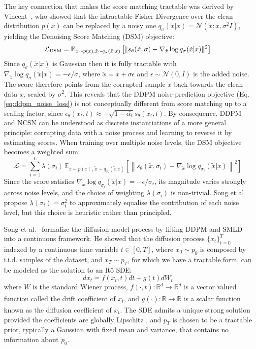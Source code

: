 The key connection that makes the score matching tractable was derived by Vincent\ \cite{vincent2011connection}, who showed that the intractable Fisher Divergence over the clean distribution \(p(x)\) can be replaced by a noisy one \(q_\sigma(\tilde{x}|x)=\mathcal{N}\left(\tilde{x};x,\sigma^2I\right)\), yielding the Denoising Score Matching (DSM) objective:
$$\mathcal{L}_{\text{DSM}}=\mathbb{E}_{x\sim p(x),\space \tilde{x}\sim q_\sigma(\tilde{x}|x)}\left[\|s_\theta(\tilde{x},\sigma)-\nabla_{\tilde{x}} \log q_\sigma(\tilde{x}|x)\|^2 \right]$$Since \(q_\sigma(\tilde{x}|x)\) is Gaussian then it is fully tractable with \(\nabla_{\tilde{x}} \log q_\sigma(\tilde{x}|x)=-\epsilon/\sigma\), where \(\tilde{x}=x+\sigma\epsilon\) and \(\epsilon\sim\mathcal{N}(0,I)\) is the added noise. The score therefore points from the corrupted sample \(\tilde{x}\) back towards the clean data \(x\), scaled by \(\sigma^2\). This reveals that the DDPM noise-prediction objective (Eq.\ref{eq:ddpm_noise_loss}) 
is not conceptually different from score matching up to a scaling factor, since 
$\epsilon_\theta(x_t,t)\approx -\sqrt{1-\bar{\alpha_t}}s_\theta(x_t,t)$. By 
consequence, DDPM and NCSN can be understood as discrete instantiations of a more 
general principle: corrupting data with a noise process and learning to reverse it 
by estimating scores. When training over multiple noise levels, the DSM objective 
becomes a weighted sum:
$$
\mathcal{L} = \sum_{i=1}^{L} \lambda(\sigma_i)\,
\mathbb{E}_{x\sim p(x),\,\tilde{x}\sim q_{\sigma_i}(\tilde{x}|x)}
\left[\left\|s_\theta(\tilde{x}, \sigma_i) - 
\nabla_{\tilde{x}}\log q_{\sigma_i}(\tilde{x}|x)\right\|^2\right]
$$
Since the score satisfies $\nabla_{\tilde{x}}\log q_{\sigma_i}(\tilde{x}|x) = 
-\epsilon/\sigma_i$, its magnitude varies strongly across noise levels, and the 
choice of weighting $\lambda(\sigma_i)$ is non-trivial. Song et al.\ \cite{song2019generative} 
propose $\lambda(\sigma_i) = \sigma_i^2$ to approximately equalise the contribution 
of each noise level, but this choice is heuristic rather than principled. 

Song et al.\ \cite{song2021score} formalize the diffusion model process by lifting DDPM and SMLD into a continuous framework. He showed that the diffusion process \(\{x_t\}_{t=0}^T\) indexed by a continuous time variable \(t\in[0,T]\), where \(x_0\sim p_0\) is composed by i.i.d. samples of the dataset, and \(x_T\sim p_T\), for which we have a tractable form, can be modeled as the solution to an Itô SDE:
\begin{equation}
    \label{eq:generalsde}
    dx_t=f(x_t,t)dt+g(t)dW_t
\end{equation}
where \(W\) is the standard Wiener process, \(f(\cdot,t):\mathbb{R}^d\xrightarrow[]{}\mathbb{R}^d\) is a vector valued function called the drift coefficient of \(x_t\), and \(g(\cdot):\mathbb{R}\xrightarrow[]{}\mathbb{R}\) is a scalar function known as
the diffusion coefficient of \(x_t\). The SDE admits a unique strong solution provided the coefficients are globally Lipschitz \cite{oksendal2003stochastic}, and \(p_T\) is chosen to be a tractable prior, typically a Gaussian with fixed mean and variance, that contains no information about \(p_0\). 

